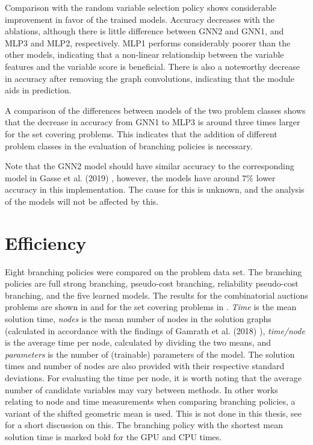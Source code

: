 Comparison with the random variable selection policy shows considerable improvement in favor of the trained models. Accuracy decreases with the ablations, although there is little difference between GNN2 and GNN1, and MLP3 and MLP2, respectively. MLP1 performs considerably poorer than the other models, indicating that a non-linear relationship between the variable features and the variable score is beneficial. There is also a noteworthy decrease in accuracy after removing the graph convolutions, indicating that the module aids in prediction.

A comparison of the differences between models of the two problem classes shows that the decrease in accuracy from GNN1 to MLP3 is around three times larger for the set covering problems. This indicates that the addition of different problem classes in the evaluation of branching policies is necessary.

Note that the GNN2 model should have similar accuracy to the corresponding model in Gasse et al. (2019) \cite{gasse2019exact}, however, the models have around $ 7 \%$ lower accuracy in this implementation. The cause for this is unknown, and the analysis of the models will not be affected by this. 



\section{Efficiency}\label{sec:res_efficiency}

Eight branching policies were compared on the problem data set. The branching policies are full strong branching, pseudo-cost branching, reliability pseudo-cost branching, and the five learned models. The results for the combinatorial auctions problems are shown in  and for the set covering problems in . \textit{Time} is the mean solution time, \textit{nodes} is the mean number of nodes in the solution graphs (calculated in accordance with the findings of Gamrath et al. (2018) \cite{gamrath2018measuring}), \textit{time/node} is the average time per node, calculated by dividing the two means, and \textit{parameters} is the number of (trainable) parameters of the model. The solution times and number of nodes are also provided with their respective standard deviations. For evaluating the time per node, it is worth noting that the average number of candidate variables may vary between methods. In other works relating to node and time measurements when comparing branching policies, a variant of the shifted geometric mean is used. This is not done in this thesis, see  for a short discussion on this. 
The branching policy with the shortest mean solution time is marked bold for the \gls{GPU} and \gls{CPU} times. 

